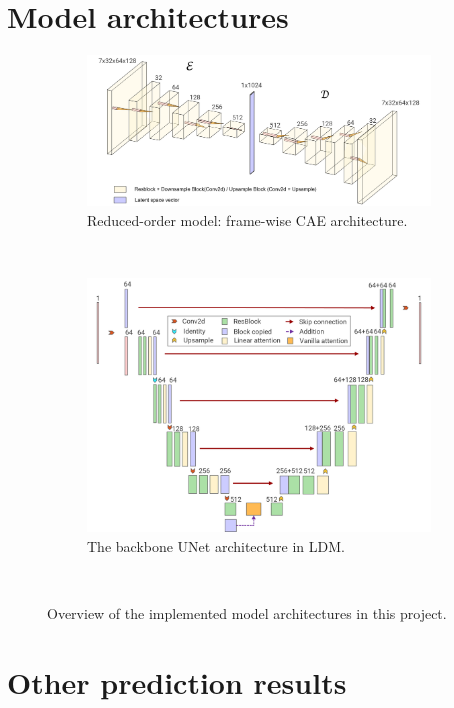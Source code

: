 \documentclass[final-report]{article-template}
\begin{document}
\section{Model architectures}
\begin{figure}[htbp]
    \renewcommand{\figurename}{Figure}
    \renewcommand{\thefigure}{A1}
    \centering
    \begin{subfigure}[t]{0.9\textwidth}
        \centering
        \includegraphics[width=\textwidth]{figures/model_cae.png}
        \caption{Reduced-order model: frame-wise CAE architecture.}
        \label{fig:cae}
    \end{subfigure} \\[11mm]
    \begin{subfigure}[t]{0.75\textwidth}
        \centering
        \includegraphics[width=\textwidth]{figures/model_unet.png}
        \caption{The backbone UNet architecture in LDM.}
        \label{fig:unet}
    \end{subfigure} \\[5mm]
    \caption{Overview of the implemented model architectures in this project.}
\end{figure}
\clearpage
\section{Other prediction results}
\end{document}
